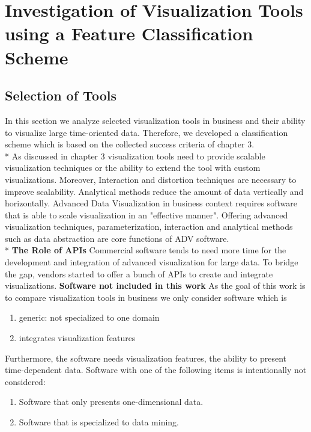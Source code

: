 \chapter{Investigation of Visualization Tools using a Feature Classification Scheme}
\label{chap:Tools}

\section{Selection of Tools}\label{tool:selection}
In this section we analyze selected visualization tools in business and their ability to visualize large time-oriented data. Therefore, we developed a classification scheme which is based on the collected success criteria of chapter 3. \\*
As discussed in chapter 3 visualization tools need to provide scalable visualization techniques or the ability to extend the tool with custom visualizations. Moreover, Interaction and distortion techniques are necessary to improve scalability. Analytical methods reduce the amount of data vertically and horizontally. 
Advanced Data Visualization in business context requires software that is able to scale visualization in an "effective manner"\cite{Russom2011}. Offering advanced visualization techniques, parameterization, interaction and analytical methods such as data abstraction\cite{Tegarden1999,Aigner2011,Eick2002,Zhanga} are core functions of ADV software. \\*
\textbf{The Role of APIs}
Commercial software tends to need more time for the development and integration of advanced visualization for large data\cite{Zhanga, Simon2014}. To bridge the gap, vendors started to offer a bunch of APIs to create and integrate visualizations. 
\textbf{Software not included in this work}
As the goal of this work is to compare visualization tools in business we only consider software which is 
\begin{enumerate}
    \item generic: not specialized to one domain
    \item integrates visualization features
\end{enumerate}

Furthermore, the software needs visualization features, the ability to present time-dependent data. Software with one of the following items is intentionally not considered: 
\begin{enumerate}
    \item Software that only presents one-dimensional data. 
    \item Software that is specialized to data mining.
\end{enumerate}

